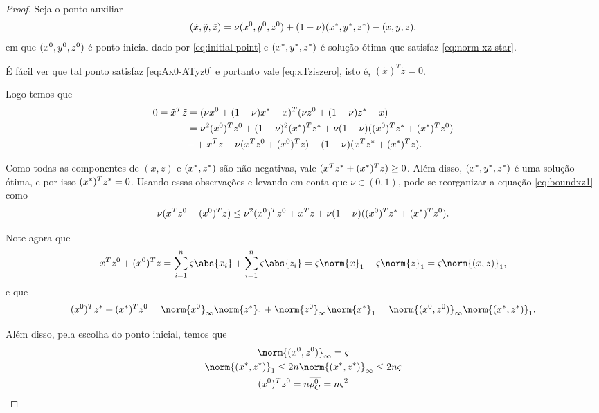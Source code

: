 \begin{proof}
	Seja o ponto auxiliar
	\[
		(\tilde{x},\tilde{y},\tilde{z})  = \nu(x^0,y^0,z^0) + (1-\nu)(x^*,y^*,z^*) - (x,y,z). 
	\]
em que $(x^0,y^0,z^0)$ é ponto inicial dado por \eqref{eq:initial-point} e $(x^*,y^*,z^*)$ é  solução ótima que satisfaz \eqref{eq:norm-xz-star}.


É fácil ver que tal ponto satisfaz \eqref{eq:Ax0-ATyz0} e portanto vale \eqref{eq:xTziszero}, isto é, $(\tilde{x})^{T}\tilde{z} = 0$. 

Logo temos que 
\begin{align}
	0  = \tilde{x}^{T}\tilde{z} & = (\nu\xzero + (1-\nu)\xstar - x)^{T}(\nu\zzero + (1-\nu)\zstar - x)\notag\\
	  & = \nu^{2}(\xzero)^T\zzero + (1-\nu)^{2}(\xstar)^{T}\zstar + \nu(1-\nu)((\xzero)^{T}\zstar + (\xstar)^{T}\zzero) \notag\\
	  & \textcolor{white}{=} + x^{T}z - \nu (x^{T}\zzero + (\xzero)^{T}z) - (1-\nu) (x^{T}\zstar + (\xstar)^{T}z).\label{eq:boundxz1}
\end{align}

Como todas as componentes de $(x,z)$ e $(x^*,z^*)$ são não-negativas, vale $(x^{T}z^* + (x^*)^{T}z) \geq 0$. Além disso, $(x^*,y^*,z^*)$ é uma solução ótima, e por isso $(x^*)^{T}z^* = 0$. Usando essas observações e levando em conta que $\nu\in(0,1)$,  pode-se reorganizar  a equação \eqref{eq:boundxz1} como
\begin{equation}
	\label{eq:xTzero+xzeroTz}
	  \nu (x^{T}z^0 + (x^0)^{T}z) \leq 
  \nu^{2}(x^0)^Tz^0  +  x^{T}z+  \nu(1-\nu)((x^0)^{T}z^* + (x^*)^{T}z^0).
\end{equation}

Note agora que 
\begin{equation}
\label{eq:normxz1}
	x^{T}\zzero + (\xzero)^{T}z = \sum_{i=1}^{n} \bdxzstar\abs{x_i} +\sum_{i=1}^{n} \bdxzstar\abs{z_i} = \bdxzstar\norm{x}_{1} + 
	\bdxzstar\norm{z}_{1} = \bdxzstar\norm{(x,z)}_{1},
\end{equation}
e que
\begin{equation}
\label{eq:norm-star-zero-infty-1}
	(\xzero)^{T}\zstar + (\xstar)^{T}\zzero  = \norm{\xzero}_{\infty}\norm{\zstar}_{1} + \norm{\zzero}_{\infty}\norm{\xstar}_{1}  = \norm{(\xzero,\zzero)}_{\infty}\norm{(\xstar,\zstar)}_{1}.
\end{equation}


Além disso, pela escolha do ponto inicial, temos que 
\begin{gather*}
	\norm{(\xzero,\zzero)}_\infty = \bdxzstar \label{eq:initial-conseq-a}\\
	\norm{(\xstar,\zstar)}_1\leq 2n\norm{(\xstar,\zstar)}_{\infty} \leq 2n \bdxzstar \label{eq:initial-conseq-b}\\
	(\xzero)^{T}\zzero = n\dbvec{\rho_C^0} = n\bdxzstar^{2}\label{eq:initial-conseq-c}
\end{gather*}


\end{proof}
